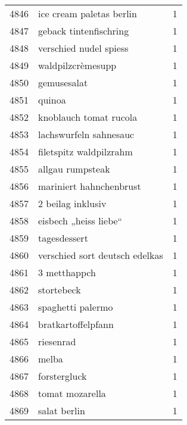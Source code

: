 \begin{tabular}{llr}
4846 &                           ice cream paletas berlin &      1 \\
4847 &                             geback tintenfischring &      1 \\
4848 &                             verschied nudel spiess &      1 \\
4849 &                                  waldpilzcrèmesupp &      1 \\
4850 &                                        gemusesalat &      1 \\
4851 &                                             quinoa &      1 \\
4852 &                             knoblauch tomat rucola &      1 \\
4853 &                             lachswurfeln sahnesauc &      1 \\
4854 &                            filetspitz waldpilzrahm &      1 \\
4855 &                                   allgau rumpsteak &      1 \\
4856 &                            mariniert hahnchenbrust &      1 \\
4857 &                                  2 beilag inklusiv &      1 \\
4858 &                              eisbech „heiss liebe“ &      1 \\
4859 &                                       tagesdessert &      1 \\
4860 &                     verschied sort deutsch edelkas &      1 \\
4861 &                                       3 metthappch &      1 \\
4862 &                                         stortebeck &      1 \\
4863 &                                  spaghetti palermo &      1 \\
4864 &                                 bratkartoffelpfann &      1 \\
4865 &                                          riesenrad &      1 \\
4866 &                                              melba &      1 \\
4867 &                                       forstergluck &      1 \\
4868 &                                    tomat mozarella &      1 \\
4869 &                                       salat berlin &      1 \\

\end{tabular}

